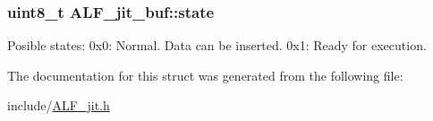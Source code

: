 \subsubsection[{\texorpdfstring{state}{state}}]{\setlength{\rightskip}{0pt plus 5cm}uint8\+\_\+t A\+L\+F\+\_\+jit\+\_\+buf\+::state}\hypertarget{structALF__jit__buf_a6c8c4d0af0f8cc06d141f6babe8236b6}{}\label{structALF__jit__buf_a6c8c4d0af0f8cc06d141f6babe8236b6}
Posible states\+: 0x0\+: Normal. Data can be inserted. 0x1\+: Ready for execution. 

The documentation for this struct was generated from the following file\+:\begin{DoxyCompactItemize}
\item 
include/\hyperlink{ALF__jit_8h}{A\+L\+F\+\_\+jit.\+h}\end{DoxyCompactItemize}
